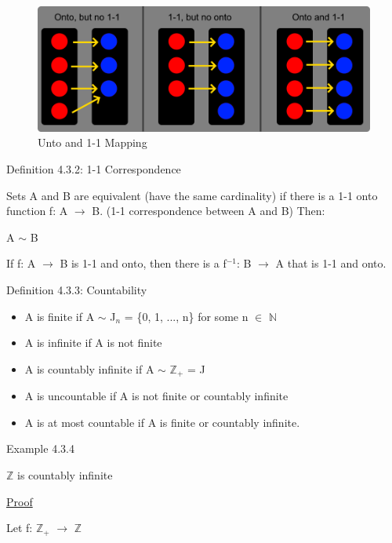 \begin{figure}[h]
	\centering
	\includegraphics[scale=0.3]{Images/4.3.1.png}
	\caption{Unto and 1-1 Mapping}
\end{figure}

{ \color{blue} Definition  4.3.2: 1-1 Correspondence} 

	\begin{adjustbox}{minipage=14cm, right}
		Sets A and B are equivalent {\color{lblue} (have the same cardinality)} if there is
		a 1-1 onto function f: A $\rightarrow$ B. {\color{lblue} (1-1 correspondence between A and B)}
		Then:

		\qquad A $\sim$ B

		If f: A $\rightarrow$ B is 1-1 and onto, then
		there is a f$^{-1}$: B $\rightarrow$ A that is 1-1 and onto.
	\end{adjustbox}

\newpage

{ \color{blue} Definition 4.3.3: Countability } 
	\begin{itemize}[leftmargin=2cm]
		\item A is {\color{lblue} finite} if A $\sim$ J$_n$ = \{0, 1, ..., n\}
			for some n $\in$ $\mathbb{N}$
		\item A is {\color{lblue} infinite} if A is not finite
		\item A is {\color{lblue} countably infinite} if A $\sim$ $\mathbb{Z}_+$ = J
		\item A is {\color{lblue} uncountable} if A is not finite or countably infinite
		\item A is {\color{lblue} at most countable} if A is finite or countably infinite.
	\end{itemize}

{ \color{purple} Example 4.3.4 } 

	\qquad $\mathbb{Z}$ is countably infinite

{ \color{magenta} \underline{Proof} } 

	Let f: $\mathbb{Z}_+$ $\rightarrow$ $\mathbb{Z}$

